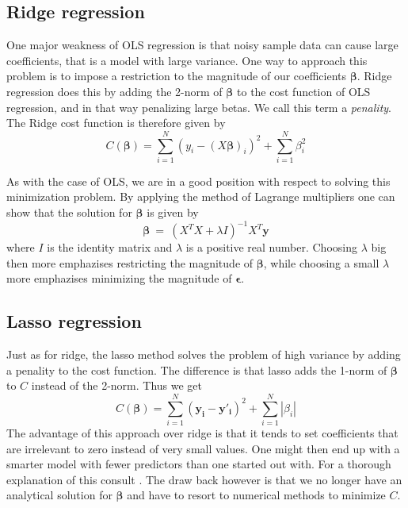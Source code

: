 \documentclass[a4paper,norsk]{article}
\begin{document}
\subsection{Ridge regression}
One major weakness of OLS regression is that noisy sample data can cause
large coefficients, that is a model with large variance. One way
to approach this problem is to impose a restriction to the magnitude of 
our coefficients $\bm{\beta}$. Ridge regression does this by adding the 
2-norm of $\bm{\beta}$ to the cost function of OLS regression, and in 
that way penalizing large betas. We call this term a \textit{penality}.
The Ridge cost function is therefore given by
\begin{equation}
    C(\bm{\beta}) = \sum_{i=1}^N (y_i - (X\bm{\beta})_i)^2 + 
    \sum_{i=1}^N \beta_i^2
\end{equation}
\par
As with the case of OLS, we are in a good position with respect to solving
this minimization problem. By applying the method of Lagrange multipliers
one can show that the solution for $\bm{\beta}$ is given by
\begin{equation}
    \bm{\beta} \ = \ (X^TX + \lambda I)^{-1}X^T\bm{y}
\end{equation}
where $I$ is the identity matrix and $\lambda$ is a positive real number.
Choosing $\lambda$ big then more emphazises restricting the magnitude of 
$\bm{\beta}$, while choosing a small $\lambda$ more emphazises
minimizing the magnitude of $\bm{\epsilon}$.

\subsection{Lasso regression}
Just as for ridge, the lasso method solves the problem of high variance 
by adding a penality to the cost function. The difference is that 
lasso adds the 1-norm of $\bm{\beta}$ to $C$ instead of the 2-norm. 
Thus we get
\begin{equation}
    C(\bm{\beta}) = \sum_{i=1}^N (\bm{y_i} - \bm{y'_i})^2 + 
    \sum_{i=1}^N |\beta_i|
\end{equation}
The advantage of this approach over ridge 
is that it tends to set coefficients that are irrelevant to zero instead
of very small values. One might then end up with a smarter model with 
fewer predictors than one started out with. For a thorough explanation 
of this consult \cite{hastie}. 
The draw back however is that we no longer have an analytical solution for
$\bm{\beta}$ and have to resort to numerical methods to minimize $C$. 
\end{document}
